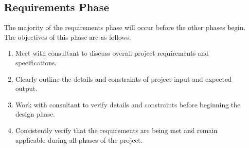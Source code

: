 \documentclass[letterpaper,12pt,titlepage]{article}
\begin{document}
\subsection{Requirements Phase}
The majority of the requirements phase will occur before the other phases
begin. The objectives of this phase are as follows.
\begin{enumerate}
 \item Meet with consultant to discuss overall project requirements and
       specifications.
 \item Clearly outline the details and constraints of project input and
      expected output.
 \item Work with consultant to verify details and constraints before beginning
       the design phase.
 \item Consistently verify that the requirements are being met and remain
       applicable during all phases of the project.
\end{enumerate}
\end{document}
